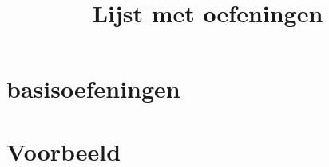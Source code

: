 \documentclass{xourse}
\title{Lijst met oefeningen}
\begin{document}
\part{basisoefeningen}




\part{Voorbeeld}
\end{document}
